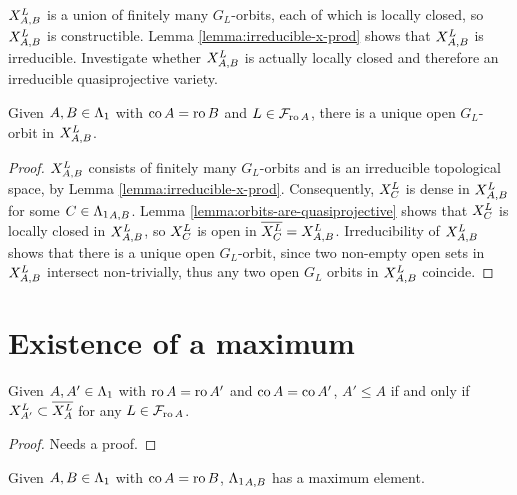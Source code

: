 \documentclass[a4paper, 11pt]{report}
\begin{document}
\begin{remark}
$\xprod[L]{A,B}$ is a union of finitely many $G_L$-orbits, each of which is locally closed, so $\xprod[L]{A,B}$ is constructible. Lemma
\ref{lemma:irreducible-x-prod} shows that $\xprod[L]{A,B}$ is irreducible. Investigate whether $\xprod[L]{A,B}$ is actually locally closed and therefore an irreducible quasiprojective variety.
\end{remark}

\begin{proposition}\label{prop:open-orbits-in-product}
Given $A,B\in\matrices$ with $\co{A}=\ro{B}$ and $L\in\flags_{\ro{A}}$, there is a unique open $G_L$-orbit in $\xprod[L]{A,B}$.
\end{proposition}

\begin{proof}
$\xprod[L]{A,B}$ consists of finitely many $G_L$-orbits and is an irreducible topological space, by Lemma \ref{lemma:irreducible-x-prod}. Consequently, $\xprod[L]{C}$ is dense in $\xprod[L]{A,B}$ for some $C\in\matrices_{A,B}$. Lemma \ref{lemma:orbits-are-quasiprojective} shows that $\xprod[L]{C}$ is locally closed in $\xprod[L]{A,B}$, so $\xprod[L]{C}$ is open in $\overline{\xprod[L]{C}}=\xprod[L]{A,B}$. Irreducibility of $\xprod[L]{A,B}$ shows that there is a unique open $G_L$-orbit, since two non-empty open sets in $\xprod[L]{A,B}$ intersect non-trivially, thus any two open $G_L$ orbits in $\xprod[L]{A,B}$ coincide.
\end{proof}

\section{Existence of a maximum}

\begin{lemma}\label{lemma:compare-partial-orders}
Given $A,A'\in\matrices$ with $\ro{A}=\ro{A'}$ and $\co{A}=\co{A'}$, $A'\le A$ if and only if $\xprod[L]{A'}\subset\overline{\xprod[L]{A}}$ for any $L\in\flags_{\ro{A}}$.
\end{lemma}

{\color{blue}
\begin{proof}
Needs a proof.
\end{proof}
}

\begin{proposition}\label{proposition:existence}
Given $A,B\in\matrices$ with $\co{A}=\ro{B}$, $\matrices_{A,B}$ has a maximum element.
\end{proposition}
\end{document}
